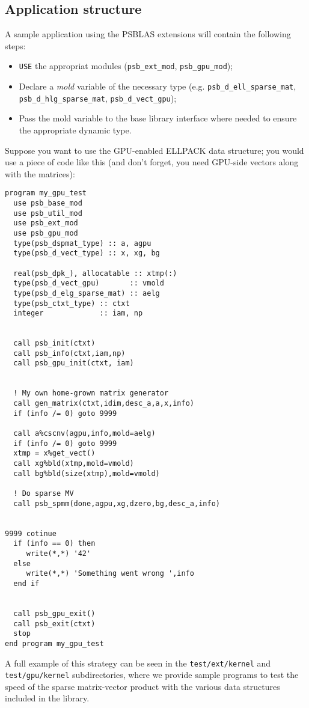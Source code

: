 \subsection{Application structure}
\label{sec:appstruct}
A sample application using the PSBLAS extensions will contain the
following steps:
\begin{itemize}
\item \verb|USE| the appropriat modules (\verb|psb_ext_mod|,
  \verb|psb_gpu_mod|);
\item Declare a \emph{mold} variable of the necessary type
  (e.g. \verb|psb_d_ell_sparse_mat|, \verb|psb_d_hlg_sparse_mat|,
  \verb|psb_d_vect_gpu|);
\item Pass the mold variable to the base library interface where
  needed to ensure the appropriate dynamic type.
\end{itemize}
Suppose you want to use the GPU-enabled ELLPACK data structure; you
would use a piece of code like this (and don't forget, you need
GPU-side vectors along with the matrices):
\begin{verbatim}
program my_gpu_test
  use psb_base_mod
  use psb_util_mod 
  use psb_ext_mod
  use psb_gpu_mod
  type(psb_dspmat_type) :: a, agpu
  type(psb_d_vect_type) :: x, xg, bg

  real(psb_dpk_), allocatable :: xtmp(:)
  type(psb_d_vect_gpu)       :: vmold
  type(psb_d_elg_sparse_mat) :: aelg
  type(psb_ctxt_type) :: ctxt
  integer             :: iam, np


  call psb_init(ctxt)
  call psb_info(ctxt,iam,np)
  call psb_gpu_init(ctxt, iam)

  
  ! My own home-grown matrix generator
  call gen_matrix(ctxt,idim,desc_a,a,x,info)
  if (info /= 0) goto 9999

  call a%cscnv(agpu,info,mold=aelg)
  if (info /= 0) goto 9999
  xtmp = x%get_vect() 
  call xg%bld(xtmp,mold=vmold)
  call bg%bld(size(xtmp),mold=vmold)
  
  ! Do sparse MV
  call psb_spmm(done,agpu,xg,dzero,bg,desc_a,info)

 
9999 cotinue
  if (info == 0) then 
     write(*,*) '42'
  else
     write(*,*) 'Something went wrong ',info
  end if
  
  
  call psb_gpu_exit()
  call psb_exit(ctxt)
  stop
end program my_gpu_test
\end{verbatim}
A full example of this strategy can be seen in the
\texttt{test/ext/kernel} and \texttt{test/\-gpu/\-kernel} subdirectories,
where we provide  sample programs 
to test the speed of the sparse matrix-vector product with the various
data structures included in the library. 





